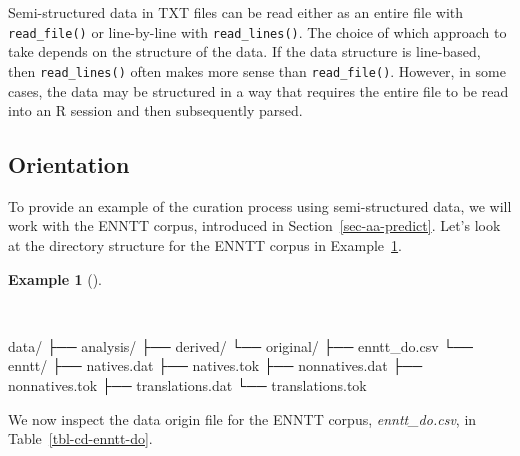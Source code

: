 \documentclass[
  letterpaper,
  DIV=11,
  numbers=noendperiod]{scrreport}
\newenvironment{Shaded}{\begin{snugshade}}{\end{snugshade}}
\newcommand{\ExtensionTok}[1]{\textcolor[rgb]{0.00,0.00,0.00}{#1}}
\newcommand{\NormalTok}[1]{\textcolor[rgb]{0.00,0.00,0.00}{#1}}
\theoremstyle{definition}
\newtheorem{example}{Example}[chapter]
\theoremstyle{remark}
\begin{document}
Semi-structured data in TXT files can be read either as an entire file
with \texttt{read\_file()} or line-by-line with \texttt{read\_lines()}.
The choice of which approach to take depends on the structure of the
data. If the data structure is line-based, then \texttt{read\_lines()}
often makes more sense than \texttt{read\_file()}. However, in some
cases, the data may be structured in a way that requires the entire file
to be read into an R session and then subsequently parsed.

\hypertarget{orientation-2}{%
\subsection{Orientation}\label{orientation-2}}

To provide an example of the curation process using semi-structured
data, we will work with the ENNTT corpus, introduced in
Section~\ref{sec-aa-predict}. Let's look at the directory structure for
the ENNTT corpus in Example~\ref{exm-cd-enntt-structure}.

\begin{example}[]\protect\hypertarget{exm-cd-enntt-structure}{}\label{exm-cd-enntt-structure}

~

\begin{Shaded}
\begin{Highlighting}[]
\ExtensionTok{data/}
\ExtensionTok{├──}\NormalTok{ analysis/}
\ExtensionTok{├──}\NormalTok{ derived/}
\ExtensionTok{└──}\NormalTok{ original/}
    \ExtensionTok{├──}\NormalTok{ enntt\_do.csv}
    \ExtensionTok{└──}\NormalTok{ enntt/}
        \ExtensionTok{├──}\NormalTok{ natives.dat}
        \ExtensionTok{├──}\NormalTok{ natives.tok}
        \ExtensionTok{├──}\NormalTok{ nonnatives.dat}
        \ExtensionTok{├──}\NormalTok{ nonnatives.tok}
        \ExtensionTok{├──}\NormalTok{ translations.dat}
        \ExtensionTok{└──}\NormalTok{ translations.tok}
\end{Highlighting}
\end{Shaded}

\end{example}

We now inspect the data origin file for the ENNTT corpus,
\emph{enntt\_do.csv}, in Table~\ref{tbl-cd-enntt-do}.
\end{document}
